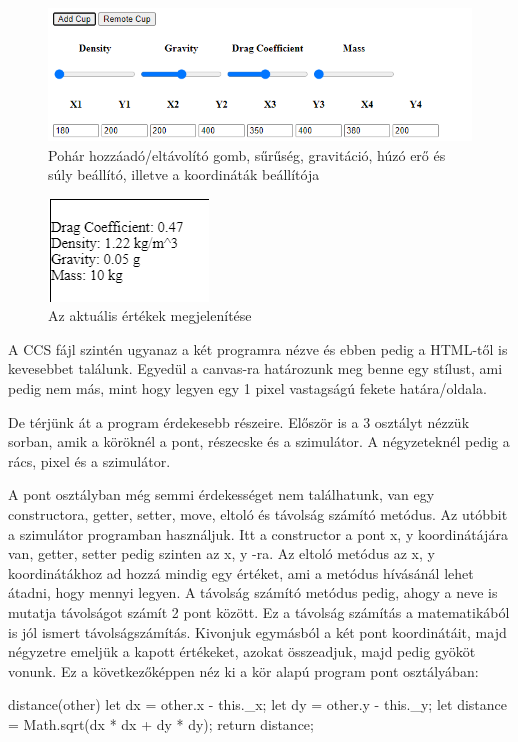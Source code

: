 \begin{figure}[h]
	\centering
	\includegraphics[scale=1]{images/html.png}
	\caption{Pohár hozzáadó/eltávolító gomb, sűrűség, gravitáció, húzó erő és súly beállító, illetve a koordináták beállítója}
	\label{fig:html}
\end{figure}

\begin{figure}[h]
	\centering
	\includegraphics[scale=1]{images/ertekek.png}
	\caption{Az aktuális értékek megjelenítése}
	\label{fig:ertekek}
\end{figure}


A CCS fájl szintén ugyanaz a két programra nézve és ebben pedig a HTML-től is kevesebbet találunk. Egyedül a canvas-ra határozunk meg benne egy stílust, ami pedig nem más, mint hogy legyen egy 1 pixel vastagságú fekete határa/oldala.


De térjünk át a program érdekesebb részeire. Először is a 3 osztályt nézzük sorban, amik a köröknél a pont, részecske és a szimulátor.
A négyzeteknél pedig a rács, pixel és a szimulátor.


A pont osztályban még semmi érdekességet nem találhatunk, van egy constructora, getter, setter, move, eltoló és távolság számító metódus. Az utóbbit a szimulátor programban használjuk. Itt a constructor a pont x, y koordinátájára van, getter, setter pedig szinten az x, y -ra. Az eltoló metódus az x, y koordinátákhoz ad hozzá mindig egy értéket, ami a metódus hívásánál lehet átadni, hogy mennyi legyen. A távolság számító metódus pedig, ahogy a neve is mutatja távolságot számít 2 pont között. Ez a távolság számítás a matematikából is jól ismert távolságszámítás. Kivonjuk egymásból a két pont koordinátáit, majd négyzetre emeljük a kapott értékeket, azokat összeadjuk, majd pedig gyököt vonunk. Ez a következőképpen néz ki a kör alapú program pont osztályában:
\begin{java}
distance(other)
  {
    let dx = other.x - this._x;
    let dy = other.y - this._y;
    let distance = Math.sqrt(dx * dx + dy * dy);
    return distance;
  }
\end{java} 

